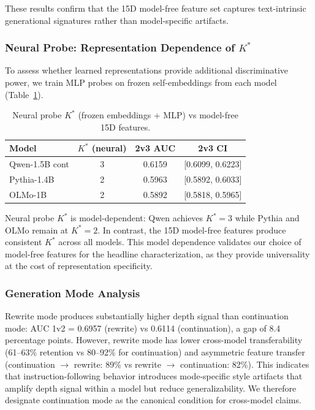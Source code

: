 \documentclass[11pt,a4paper]{article}
\begin{document}
These results confirm that the 15D model-free feature set captures text-intrinsic generational signatures rather than model-specific artifacts.

\subsubsection{Neural Probe: Representation Dependence of $K^*$}

To assess whether learned representations provide additional discriminative power, we train MLP probes on frozen self-embeddings from each model (Table~\ref{tab:neural_probe}).

\begin{table}[h]
\centering
\caption{Neural probe $K^*$ (frozen embeddings + MLP) vs model-free 15D features.}
\label{tab:neural_probe}
\small
\begin{tabular}{lccc}
\toprule
\textbf{Model} & \textbf{$K^*$ (neural)} & \textbf{2v3 AUC} & \textbf{2v3 CI} \\
\midrule
Qwen-1.5B cont & 3 & 0.6159 & [0.6099, 0.6223] \\
Pythia-1.4B & 2 & 0.5963 & [0.5892, 0.6033] \\
OLMo-1B & 2 & 0.5892 & [0.5818, 0.5965] \\
\bottomrule
\end{tabular}
\end{table}

Neural probe $K^*$ is model-dependent: Qwen achieves $K^*=3$ while Pythia and OLMo remain at $K^*=2$. In contrast, the 15D model-free features produce consistent $K^*$ across all models. This model dependence validates our choice of model-free features for the headline characterization, as they provide universality at the cost of representation specificity.

\subsubsection{Generation Mode Analysis}

Rewrite mode produces substantially higher depth signal than continuation mode: AUC 1v2 = 0.6957 (rewrite) vs 0.6114 (continuation), a gap of 8.4 percentage points. However, rewrite mode has lower cross-model transferability (61--63\% retention vs 80--92\% for continuation) and asymmetric feature transfer (continuation $\to$ rewrite: 89\% vs rewrite $\to$ continuation: 82\%). This indicates that instruction-following behavior introduces mode-specific style artifacts that amplify depth signal within a model but reduce generalizability. We therefore designate continuation mode as the canonical condition for cross-model claims.
\end{document}
